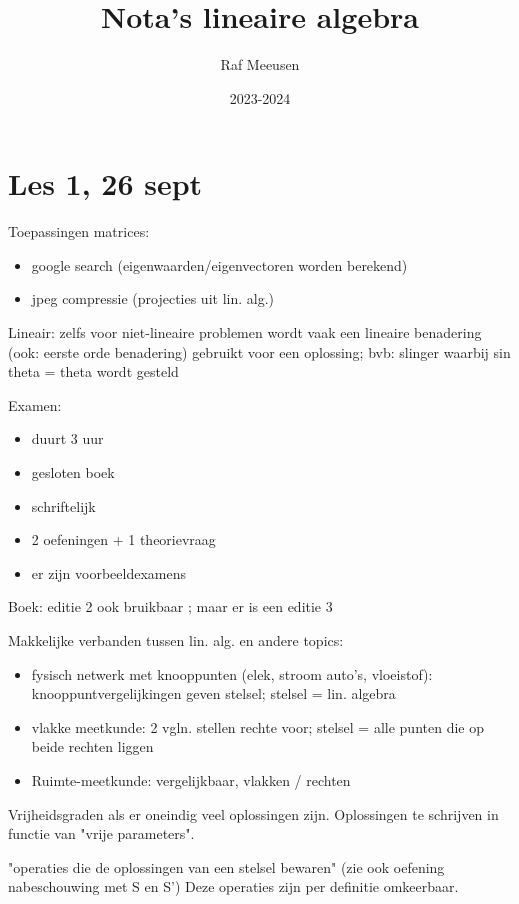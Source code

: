 \documentclass{article}
\title{Nota's lineaire algebra}
\author{Raf Meeusen}
\date{2023-2024}
\begin{document}
\maketitle

\section{Les 1, 26 sept}

Toepassingen matrices: 
\begin{itemize}
\item google search (eigenwaarden/eigenvectoren worden berekend) 
\item jpeg compressie (projecties uit lin. alg.) 
\end{itemize}


Lineair: zelfs voor niet-lineaire problemen wordt vaak een lineaire benadering (ook: eerste orde benadering) gebruikt voor een oplossing; bvb: slinger waarbij sin theta = theta wordt gesteld

Examen: 
\begin{itemize}
\item duurt 3 uur
\item gesloten boek
\item schriftelijk
\item 2 oefeningen + 1 theorievraag
\item er zijn voorbeeldexamens 
\end{itemize}

Boek: editie 2 ook bruikbaar ; maar er is een editie 3 


Makkelijke verbanden tussen lin. alg. en andere topics: 
\begin{itemize}
    \item fysisch netwerk met knooppunten (elek, stroom auto's, vloeistof): knooppuntvergelijkingen geven stelsel; stelsel = lin. algebra
    \item vlakke meetkunde: 2 vgln. stellen rechte voor; stelsel = alle punten die op beide rechten liggen
    \item Ruimte-meetkunde: vergelijkbaar, vlakken / rechten
\end{itemize}

Vrijheidsgraden als er oneindig veel oplossingen zijn. Oplossingen te schrijven in functie van "vrije parameters". 

"operaties die de oplossingen van een stelsel bewaren" 
(zie ook oefening nabeschouwing met S en S') 
Deze operaties zijn per definitie omkeerbaar.  
\end{document}
